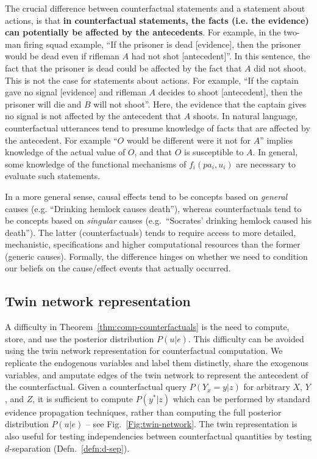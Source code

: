 \documentclass[11pt]{article}
\numberwithin{equation}{section}
\begin{document}
The crucial difference between counterfactual statements and a statement about actions, is that \textbf{in counterfactual statements, the facts (i.e. the evidence) can potentially be affected by the antecedents}. For example, in the two-man firing squad example, ``If the prisoner is dead [evidence], then the prisoner would be dead even if rifleman $A$ had not shot [antecedent]''. In this sentence, the fact that the prisoner is dead could be affected by the fact that $A$ did not shoot. This is not the case for statements about actions. For example, ``If the captain gave no signal [evidence] and rifleman $A$ decides to shoot [antecedent], then the prisoner will die and $B$ will not shoot''. Here, the evidence that the captain gives no signal is not affected by the antecedent that $A$ shoots. In natural language, counterfactual utterances tend to presume knowledge of facts that are affected by the antecedent. For example ``$O$ would be different were it not for $A$'' implies knowledge of the actual value of $O$, and that $O$ is susceptible to $A$. In general, some knowledge of the functional mechanisms of $f_i(pa_i, u_i)$ are necessary to evaluate such statements.

In a more general sense, causal effects tend to be concepts based on \textit{general} causes (e.g. ``Drinking hemlock causes death''), whereas counterfactuals tend to be concepts based on \textit{singular} causes (e.g.\ ``Socrates' drinking hemlock caused his death''). The latter (counterfactuals) tends to require access to more detailed, mechanistic, specifications and higher computational resources than the former (generic causes). Formally, the difference hinges on whether we need to condition our beliefs on the cause/effect events that actually occurred. 

\subsection{Twin network representation}
A difficulty in Theorem~\ref{thm:comp-counterfactuals} is the need to compute, store, and use the posterior distribution $P(u|e)$. This difficulty can be avoided using the twin network representation for counterfactual computation. We replicate the endogenous variables and label them distinctly, share the exogenous variables, and amputate edges of the twin network to represent the antecedent of the counterfactual. Given a counterfactual query $P(Y_x=y|z)$ for arbitrary $X$, $Y$, and $Z$, it is sufficient to compute $P(y^*|z)$ which can be performed by standard evidence propagation techniques, rather than computing the full posterior distribution $P(u|e)$ -- see Fig.~\ref{Fig:twin-network}. The twin representation is also useful for testing independencies between counterfactual quantities by testing $d$-separation (Defn.~\ref{defn:d-sep}).
\end{document}
